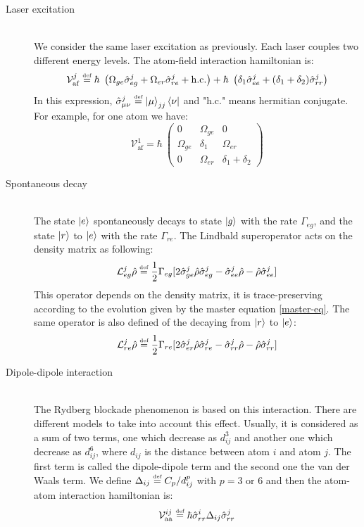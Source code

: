\documentclass[%
]{scrreprt}
\newcommand{\defi}{\xspace\ensuremath{\overset{\text{\tiny def}}{=}}\xspace}
\newcommand{\ff}{\ensuremath{\ket{g}}\xspace}
\newcommand{\ee}{\ensuremath{\ket{e}}\xspace}
\newcommand{\rr}{\ensuremath{\ket{r}}\xspace}
\newcommand{\Om}{\Omega}
\newcommand{\Ga}{\Gamma}
\newcommand{\hlf}{\frac{1}{2}}
\newcommand{\mc}[1]{\mathcal{#1}}
\newcommand{\sig}{\hat{\sigma}}
\newcommand{\hrho}{\hat{\rho}}
\begin{document}
\begin{description}
  \item[Laser excitation] \hfill \\
  We consider the same laser excitation as previously. Each laser couples two different energy levels. The atom-field interaction hamiltonian is:
  \[\mc{V}^j_{\mathrm{af}} \defi \hbar \ \left(\Om_{ge} \sig_{eg}^j + \Om_{er} \sig_{re}^j + \mathrm{h.c.}\right) + \hbar \ \left(\delta_1 \sig_{ee}^j + (\delta_1+\delta_2) \sig_{rr}^j \right) \]
  In this expression, $\sig_{\mu \nu}^j \defi \ket{\mu}_{jj}\bra{\nu}$ and "h.c." means hermitian conjugate. For example, for one atom we have: \[\mc{V}^1_{\mathrm{af}} = \hbar \ \begin{pmatrix}
0 & \Om_{ge} & 0 \\
\Om_{ge}& \delta_1 & \Om_{er} \\
0 & \Om_{er} & \delta_1 + \delta_2
\end{pmatrix} \]
  \item[Spontaneous decay] \hfill \\
  The state \ee spontaneously decays to state \ff with the rate $\Ga_{eg}$, and the state \rr to \ee with the rate $\Ga_{re}$. The Lindbald superoperator acts on the density matrix as following: 
  \[ \mc{L}_{eg}^j \hrho \defi \hlf \Ga_{eg} [2 \sig_{ge}^j \hrho \sig_{eg}^j - \sig_{ee}^j \hrho - \hrho \sig_{ee}^j] \]
  This operator depends on the density matrix, it is trace-preserving according to the evolution given by the master equation \cref{master-eq}. The same operator is also defined of the decaying from \rr to \ee: \[ \mc{L}_{re}^j \hrho \defi \hlf \Ga_{re} [2 \sig_{er}^j \hrho \sig_{re}^j - \sig_{rr}^j \hrho - \hrho \sig_{rr}^j] \]

  \item[Dipole-dipole interaction] \hfill \\
  The Rydberg blockade phenomenon is based on this interaction. There are different models to take into account this effect. Usually, it is considered as a sum of two terms, one which decrease as $d_{ij}^3$ and another one which decrease as $d_{ij}^6$, where $d_{ij}$ is the distance between atom $i$ and atom $j$. The first term is called the dipole-dipole term and the second one the van der Waals term. We define $\Delta_{ij} \defi C_p/d_{ij}^{p}$ with $p = 3 \text{~or~} 6$ and then the atom-atom interaction hamiltonian is:
  \[ \mc{V}_{\mathrm{aa}}^{ij} \defi \hbar  \sig_{rr}^i \Delta_{ij} \sig_{rr}^j \]
\end{description}
\end{document}
